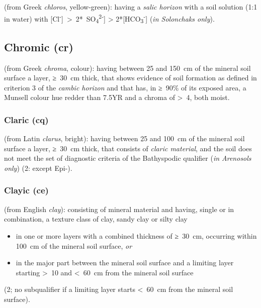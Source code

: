 \documentclass[
  letterpaper,
  DIV=11,
  numbers=noendperiod]{scrreprt}
\providecommand{\tightlist}{%
  \setlength{\itemsep}{0pt}\setlength{\parskip}{0pt}}\usepackage{longtable,booktabs,array}
\begin{document}
(from Greek \emph{chloros}, yellow-green): having a \emph{salic horizon}
with a soil solution (1:1 in water) with
{[}Cl\textsuperscript{-}{]}~\textgreater~2*~SO\textsubscript{4}\textsuperscript{2-}{]}
\textgreater{} 2*{[}HCO\textsubscript{3}\textsuperscript{-}{]} (\emph{in
Solonchaks only}).

\hypertarget{chromic-cr}{%
\subsection{Chromic (cr)}\label{chromic-cr}}

(from Greek \emph{chroma}, colour): having between 25 and 150~cm of the
mineral soil surface a layer, ≥~30~cm thick, that shows evidence of soil
formation as defined in criterion 3 of the \emph{cambic horizon} and
that has, in ≥~90\% of its exposed area, a Munsell colour hue redder
than 7.5YR and a chroma of \textgreater~4, both moist.

\hypertarget{claric-cq}{%
\subsubsection{Claric (cq)}\label{claric-cq}}

(from Latin \emph{clarus}, bright): having between 25 and 100~cm of the
mineral soil surface a layer, ≥~30~cm thick, that consists of
\emph{claric material}, and the soil does not meet the set of diagnostic
criteria of the Bathyspodic qualifier (\emph{in Arenosols only}) (2:
except Epi-).

\hypertarget{clayic-ce}{%
\subsubsection{Clayic (ce)}\label{clayic-ce}}

(from English \emph{clay}): consisting of mineral material and having,
single or in combination, a texture class of clay, sandy clay or silty
clay

\begin{itemize}
\tightlist
\item
  in one or more layers with a combined thickness of ≥~30~cm, occurring
  within 100~cm of the mineral soil surface, \emph{or}
\item
  in the major part between the mineral soil surface and a limiting
  layer starting \textgreater~10 and \textless~60~cm from the mineral
  soil surface
\end{itemize}

(2; no subqualifier if a limiting layer starts \textless~60~cm from the
mineral soil surface).
\end{document}
